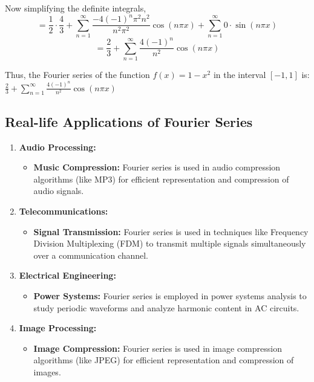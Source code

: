\documentclass{MathematicaReport}
\begin{document}
Now simplifying the definite integrals,
\[ = \frac{1}{2} \cdot \frac{4}{3} + \sum_{n=1}^{\infty} \frac{-4(-1)^n\pi^2n^2}{n^2\pi^2} \cos(n\pi x) + \sum_{n=1}^{\infty} 0 \cdot \sin(n\pi x) \]
\[ = \frac{2}{3} + \sum_{n=1}^{\infty} \frac{4(-1)^n}{n^2} \cos(n\pi x) \]

Thus, the Fourier series of the function $f(x)=1-x^2$ in the interval 
$[-1,1]$ is: $\frac{2}{3} + \sum_{n=1}^{\infty} \frac{4(-1)^n}{n^2} \cos(n\pi x)$

\subsection{Real-life Applications of Fourier Series}

\begin{enumerate}[label=\arabic*.]
    \item \textbf{Audio Processing:}
    \begin{itemize}
	\item \textbf{Music Compression:} Fourier series is used in audio
	compression algorithms (like MP3) for efficient representation and
	compression of audio signals.
    \end{itemize}
    
    \item \textbf{Telecommunications:}
    \begin{itemize}
	\item \textbf{Signal Transmission:} Fourier series is used in techniques
	like Frequency Division Multiplexing (FDM) to transmit multiple signals
	simultaneously over a communication channel.
    \end{itemize}
    
    \item \textbf{Electrical Engineering:}
    \begin{itemize}
	\item \textbf{Power Systems:} Fourier series is employed in power
	systems analysis to study periodic waveforms and analyze harmonic
	content in AC circuits.
    \end{itemize}
    
    \item \textbf{Image Processing:}
    \begin{itemize}
	\item \textbf{Image Compression:} Fourier series is used in image
	compression algorithms (like JPEG) for efficient representation and
	compression of images.
    \end{itemize}
    

\end{enumerate}
\end{document}

